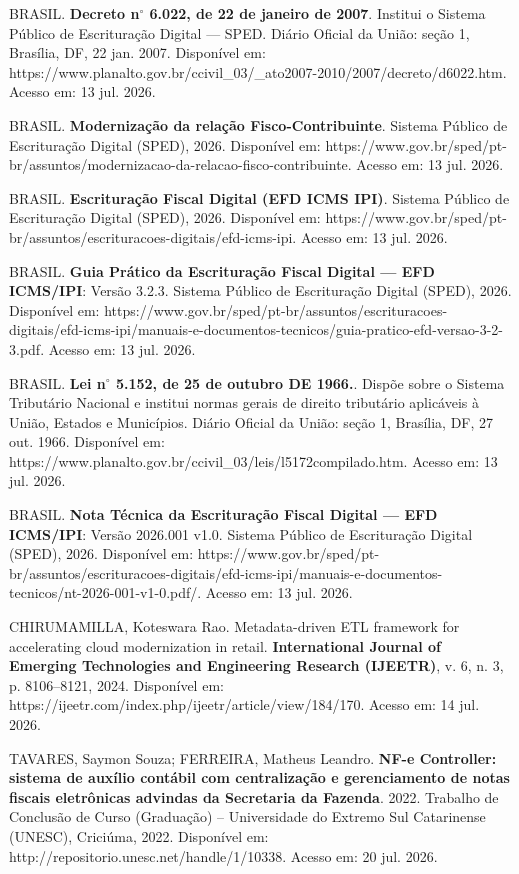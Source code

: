  BRASIL. \textbf{Decreto n\(^\circ\) 6.022, de 22 de janeiro de 2007}. Institui o Sistema Público de Escrituração Digital --- SPED. Diário Oficial da União: seção 1, Brasília, DF, 22 jan. 2007. Disponível em: https://www.planalto.gov.br/ccivil\_03/\_ato2007-2010/2007/decreto/d6022.htm. Acesso em: 13 jul. 2026.

 BRASIL. \textbf{Modernização da relação Fisco-Contribuinte}. Sistema Público de Escrituração Digital (SPED), 2026. Disponível em: https://www.gov.br/sped/pt-br/assuntos/modernizacao-da-relacao-fisco-contribuinte. Acesso em: 13 jul. 2026.

 BRASIL. \textbf{Escrituração Fiscal Digital (EFD ICMS IPI)}. Sistema Público de Escrituração Digital (SPED), 2026. Disponível em: https://www.gov.br/sped/pt-br/assuntos/escrituracoes-digitais/efd-icms-ipi. Acesso em: 13 jul. 2026.

 BRASIL. \textbf{Guia Prático da Escrituração Fiscal Digital --- EFD ICMS/IPI}: Versão 3.2.3. Sistema Público de Escrituração Digital (SPED), 2026. Disponível em: https://www.gov.br/sped/pt-br/assuntos/escrituracoes-digitais/efd-icms-ipi/manuais-e-documentos-tecnicos/guia-pratico-efd-versao-3-2-3.pdf. Acesso em: 13 jul. 2026.

 BRASIL. \textbf{Lei n\(^\circ\) 5.152, de 25 de outubro DE 1966.}. Dispõe sobre o Sistema Tributário Nacional e institui normas gerais de direito tributário aplicáveis à União, Estados e Municípios. Diário Oficial da União: seção 1, Brasília, DF, 27 out. 1966. Disponível em: https://www.planalto.gov.br/ccivil\_03/leis/l5172compilado.htm. Acesso em: 13 jul. 2026.

 BRASIL. \textbf{Nota Técnica da Escrituração Fiscal Digital --- EFD ICMS/IPI}: Versão 2026.001 v1.0. Sistema Público de Escrituração Digital (SPED), 2026. Disponível em: https://www.gov.br/sped/pt-br/assuntos/escrituracoes-digitais/efd-icms-ipi/manuais-e-documentos-tecnicos/nt-2026-001-v1-0.pdf/. Acesso em: 13 jul. 2026.

 CHIRUMAMILLA, Koteswara Rao. Metadata-driven ETL framework for accelerating cloud modernization in retail. \textbf{International Journal of Emerging Technologies and Engineering Research (IJEETR)}, v. 6, n. 3, p. 8106--8121, 2024. Disponível em: https://ijeetr.com/index.php/ijeetr/article/view/184/170. Acesso em: 14 jul. 2026.

 TAVARES, Saymon Souza; FERREIRA, Matheus Leandro. \textbf{NF-e Controller: sistema de auxílio contábil com centralização e gerenciamento de notas fiscais eletrônicas advindas da Secretaria da Fazenda}. 2022. Trabalho de Conclusão de Curso (Graduação) -- Universidade do Extremo Sul Catarinense (UNESC), Criciúma, 2022. Disponível em: http://repositorio.unesc.net/handle/1/10338. Acesso em: 20 jul. 2026.

